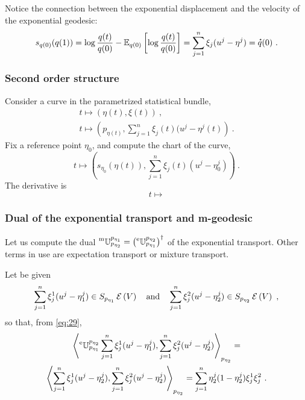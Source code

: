 \documentclass[12pt,a4paper]{amsart}
\newcommand{\transposed}{\dagger}
\theoremstyle{remark}
\begin{document}
Notice the connection between the exponential displacement and the velocity of the exponential geodesic:
\begin{equation}
  \label{eq:51}
  s_{q(0)}(q(1)) = \log \frac {q(t)}{q(0)} - \expectat {q(0)} {\log \frac {q(t)}{q(0)}} = \sum_{j=1}^n \xi_j(u^j - \eta^j) = \velocity q(0) \ .
\end{equation}

\subsubsection{Second order structure}
\label{sec:second-order-struct}

Consider a curve in the parametrized statistical bundle,
\begin{gather}
  \label{eq:71}
  t \mapsto (\eta(t),\xi(t)) \ , \\
  t \mapsto \left(p_{\eta(t)},\sum_{j=1}^n \xi_j(t)(u^j-\eta^j(t)\right) \ .
  \end{gather}
  Fix a reference point $\eta_0$, and compute the chart of the curve,
  \begin{equation}
    \label{eq:72}
   t \mapsto \left(s_{\eta_0}(\eta(t)),\sum_{j=1}^n \xi_j(t)(u^j-\eta^j_0)\right) \ .
 \end{equation}
 The derivative is
 \begin{equation}
   \label{eq:73}
   t \mapsto 
 \end{equation}

\subsubsection{Dual of the exponential transport and m-geodesic}
\label{sec:dual-expon-transp}
Let us compute the dual $\mtransport {p_{\eta_2}}{p_{\eta_1}} = \left(\etransport {p_{\eta_1}}{p_{\eta_2}}\right)^\transposed$ of the exponential transport. Other terms in use are expectation transport or mixture transport.

Let be given
\begin{equation}
  \label{eq:38}
  \sum_{j=1}^n \xi_j^1(u^j - \eta^j_1) \in \expfibreat {p_{\eta_1}} V \quad \text{and} \quad \sum_{j=1}^n \xi_j^2(u^j - \eta^j_2) \in \expfibreat {p_{\eta_2}} V \ ,
\end{equation}
so that, from \cref{eq:29},
\begin{multline}
  \label{eq:39}
  \scalarat {p_{\eta_2}} {\etransport {p_{\eta_1}} {p_{\eta_2}}  \sum_{j=1}^n \xi_j^1(u^j - \eta^j_1)} {\sum_{j=1}^n \xi_j^2(u^j - \eta^j_2)} = \\
   \scalarat {p_{\eta_2}} {\sum_{j=1}^n \xi_j^1(u^j - \eta^j_2)} {\sum_{j=1}^n \xi_j^2(u^j - \eta^j_2)} = 
   \sum_{j=1}^n \eta^j_2(1-\eta^j_2) \xi_j^1 \xi_j^2 \ . 
 \end{multline}
\end{document}
